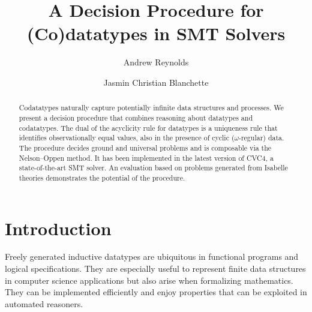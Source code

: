 
\makeatletter
\ps@myheadings
\makeatother







\title{A Decision Procedure for (Co)datatypes in SMT Solvers}

\author {Andrew Reynolds \and Jasmin Christian Blanchette}

\maketitle

\begin{abstract}
Codatatypes naturally capture potentially infinite data structures and
processes. We present a decision procedure that combines reasoning about
datatypes and codatatypes. The dual of the acyclicity rule for datatypes is a
uniqueness rule that identifies observationally equal values, also in the presence of cyclic
($\omega$-regular) data. The procedure decides ground and universal
problems and is composable via the Nelson--Oppen method. It has been
implemented in the latest version of CVC4, a state-of-the-art SMT solver. An
evaluation based on problems generated from Isabelle theories demonstrates the
potential of the procedure.
\end{abstract}

\setcounter{footnote}{0}

\section{Introduction}
\label{sec:introduction}

Freely generated inductive datatypes are ubiquitous in functional programs and
logical specifications. They are especially
useful to represent finite data structures in computer science applications but
also arise when formalizing mathematics.
They can be implemented efficiently and enjoy
properties that can be exploited in automated reasoners.
%

